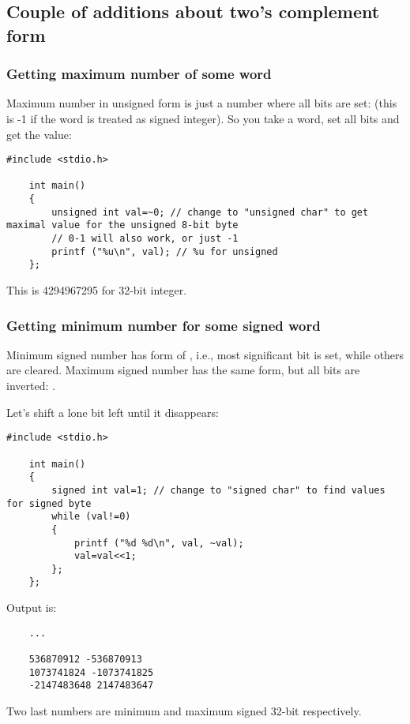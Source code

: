 \subsection{Couple of additions about two's complement form}

\subsubsection{Getting maximum number of some \gls{word}}

Maximum number in unsigned form is just a number where all bits are set: 
(this is -1 if the \gls{word} is treated as signed integer).
So you take a \gls{word}, set all bits and get the value:

\begin{lstlisting}[style=customc]
	#include <stdio.h>

	int main()
	{
		unsigned int val=~0; // change to "unsigned char" to get maximal value for the unsigned 8-bit byte
		// 0-1 will also work, or just -1
		printf ("%u\n", val); // %u for unsigned
	};
\end{lstlisting}

This is 4294967295 for 32-bit integer.

\subsubsection{Getting minimum number for some signed \gls{word}}

Minimum signed number has form of , i.e., most significant bit is set, while others are cleared.
Maximum signed number has the same form, but all bits are inverted: .

Let's shift a lone bit left until it disappears:

\begin{lstlisting}[style=customc]
	#include <stdio.h>

	int main()
	{
		signed int val=1; // change to "signed char" to find values for signed byte
		while (val!=0)
		{
			printf ("%d %d\n", val, ~val);
			val=val<<1;
		};
	};
\end{lstlisting}

Output is:

\begin{lstlisting}
	...

	536870912 -536870913
	1073741824 -1073741825
	-2147483648 2147483647
\end{lstlisting}

Two last numbers are minimum and maximum signed 32-bit  respectively.

